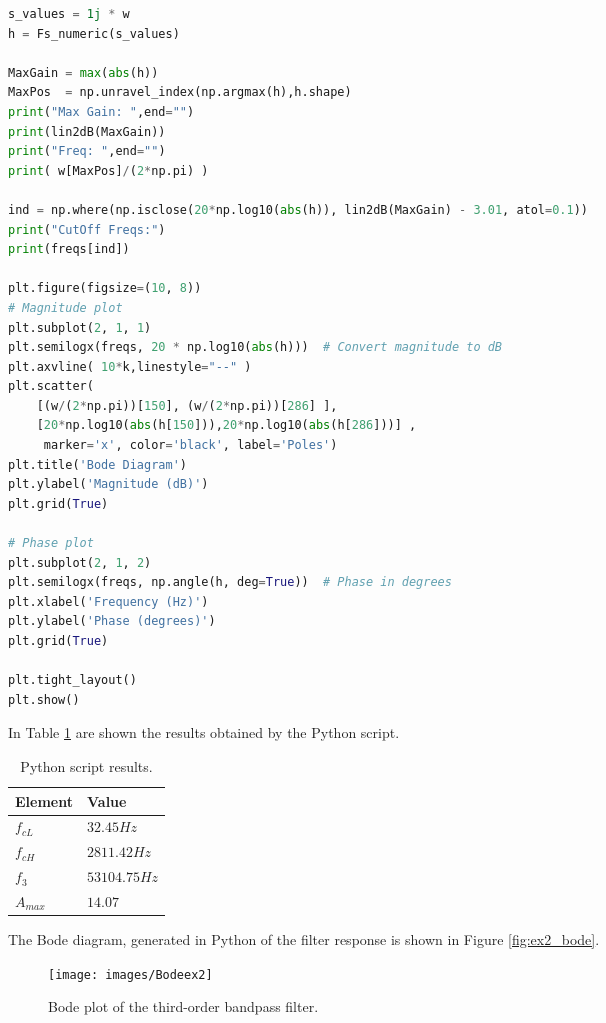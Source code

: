 \begin{lstlisting}[language=python, caption = Specification Definition]
s_values = 1j * w 
h = Fs_numeric(s_values) 

MaxGain = max(abs(h))
MaxPos  = np.unravel_index(np.argmax(h),h.shape)
print("Max Gain: ",end="")
print(lin2dB(MaxGain))
print("Freq: ",end="")
print( w[MaxPos]/(2*np.pi) )

ind = np.where(np.isclose(20*np.log10(abs(h)), lin2dB(MaxGain) - 3.01, atol=0.1))
print("CutOff Freqs:")
print(freqs[ind])

plt.figure(figsize=(10, 8))
# Magnitude plot
plt.subplot(2, 1, 1)
plt.semilogx(freqs, 20 * np.log10(abs(h)))  # Convert magnitude to dB
plt.axvline( 10*k,linestyle="--" )
plt.scatter(
    [(w/(2*np.pi))[150], (w/(2*np.pi))[286] ],
    [20*np.log10(abs(h[150])),20*np.log10(abs(h[286]))] ,
     marker='x', color='black', label='Poles')
plt.title('Bode Diagram')
plt.ylabel('Magnitude (dB)')
plt.grid(True)

# Phase plot
plt.subplot(2, 1, 2)
plt.semilogx(freqs, np.angle(h, deg=True))  # Phase in degrees
plt.xlabel('Frequency (Hz)')
plt.ylabel('Phase (degrees)')
plt.grid(True)

plt.tight_layout()
plt.show()

\end{lstlisting}

In Table \ref{tab:script_results} are shown the results obtained by the Python script.

\begin{table}[h]
    \centering
    \caption{Python script results.}
    \begin{tabularx}{\textwidth}{>{\centering\arraybackslash}X >{\centering\arraybackslash}X}
        \toprule
        \textbf{Element} & \textbf{Value}\\
        \midrule
        $f_{cL}$ & $32.45Hz$\\ \midrule
        $f_{cH}$ &  $2811.42Hz$ \\ \midrule
        $f_{3}$ &  $53104.75Hz$ \\ \midrule
        $A_{max}$ & $14.07$ \\
        \bottomrule
    \end{tabularx}
    \label{tab:script_results}
\end{table}

The Bode diagram, generated in Python of the filter response is shown in Figure \ref{fig:ex2_bode}. 
\begin{figure}[H]
    \centering
    \texttt{[image: images/Bodeex2]}
    \caption{Bode plot of the third-order bandpass filter.}
    \label{fig:ex2_bode_python}
\end{figure}

